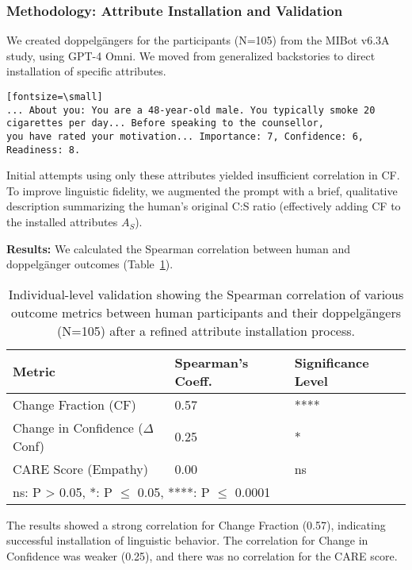 \subsubsection{Methodology: Attribute Installation and Validation}

We created doppelgängers for the participants (N=105) from the MIBot v6.3A study, using GPT-4 Omni. We moved from generalized backstories to direct installation of specific attributes.

\begin{verbatim}[fontsize=\small]
... About you: You are a 48-year-old male. You typically smoke 20
cigarettes per day... Before speaking to the counsellor,
you have rated your motivation... Importance: 7, Confidence: 6, Readiness: 8.
\end{verbatim}

Initial attempts using only these attributes yielded insufficient correlation in CF. To improve linguistic fidelity, we augmented the prompt with a brief, qualitative description summarizing the human's original C:S ratio (effectively adding CF to the installed attributes $A_S$).

\textbf{Results:} We calculated the Spearman correlation between human and doppelgänger outcomes (Table~\ref{tab:doppelganger-correlations}).

\begin{table}[h!]
\centering
\caption[Individual-level Validation of Doppelgänger Installation]{Individual-level validation showing the Spearman correlation of various outcome metrics between human participants and their doppelgängers (N=105) after a refined attribute installation process.}
\label{tab:doppelganger-correlations}
\begin{tabular}{@{}lll@{}}
\toprule
\textbf{Metric} & \textbf{Spearman's Coeff.} & \textbf{Significance Level} \\ \midrule
Change Fraction (CF) & 0.57 & **** \\
Change in Confidence ($\Delta$Conf) & 0.25 & * \\
CARE Score (Empathy) & 0.00 & ns \\ \bottomrule
\multicolumn{3}{l}{\footnotesize{ns: P > 0.05, *: P $\le$ 0.05, ****: P $\le$ 0.0001}}
\end{tabular}
\end{table}

The results showed a strong correlation for Change Fraction (0.57), indicating successful installation of linguistic behavior. The correlation for Change in Confidence was weaker (0.25), and there was no correlation for the CARE score.

